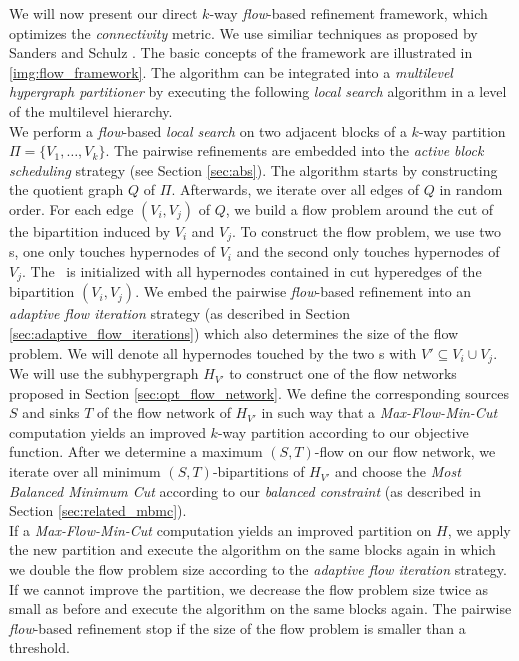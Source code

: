 We will now present our direct $k$-way \emph{flow}-based refinement framework, which optimizes
the \emph{connectivity} metric. We use similiar techniques as proposed
by Sanders and Schulz \cite{sanders2011engineering}. 
The basic concepts of the framework are illustrated in \autoref{img:flow_framework}.
The algorithm can be integrated into a \emph{multilevel hypergraph partitioner} 
by executing the following \emph{local search} algorithm in a level of the
multilevel hierarchy.  \\
We perform a \emph{flow}-based \emph{local search} on two adjacent blocks of
a $k$-way partition $\Pi = \{V_1,\ldots,V_k\}$. The pairwise refinements are embedded 
into the \emph{active block scheduling} strategy (see Section \ref{sec:abs}).
The algorithm starts by constructing the quotient graph $Q$ of $\Pi$. 
Afterwards, we iterate over all edges of $Q$ in random order. For each edge
$(V_i,V_j)$ of $Q$, we build a flow problem around the cut of the bipartition
induced by $V_i$ and $V_j$. To construct the flow problem, we use two \BFS s, one only 
touches hypernodes of $V_i$ and the second only touches hypernodes of $V_j$.
The \BFS~is initialized with all hypernodes contained in cut hyperedges
of the bipartition $(V_i,V_j)$. We embed the pairwise \emph{flow}-based refinement
into an \emph{adaptive flow iteration} strategy
(as described in Section \ref{sec:adaptive_flow_iterations}) which also determines
the size of the flow problem. We will denote all hypernodes touched by 
the two \BFS s with $V' \subseteq V_i \cup V_j$.\\
We will use the subhypergraph $H_{V'}$ to construct one of the flow networks 
proposed in Section \ref{sec:opt_flow_network}. 
We define the corresponding sources $S$
and sinks $T$ of the flow network of $H_{V'}$ in such way that a \emph{Max-Flow-Min-Cut} 
computation yields an improved $k$-way partition according to our objective function.
After we determine a maximum $(S,T)$-flow on our flow network, we iterate over
all minimum $(S,T)$-bipartitions of $H_{V'}$  and choose 
the \emph{Most Balanced Minimum Cut} according to our \emph{balanced constraint} 
(as described in Section \ref{sec:related_mbmc}). \\
If a \emph{Max-Flow-Min-Cut} computation yields an improved partition on $H$, we apply
the new partition and execute the algorithm on the same blocks again in which we double
the flow problem size according to the \emph{adaptive flow iteration} strategy. If
we cannot improve the partition, we decrease the flow problem size twice as small
as before and execute the algorithm on the same blocks again. The pairwise \emph{flow}-based
refinement stop if the size of the flow problem is smaller than a threshold.

